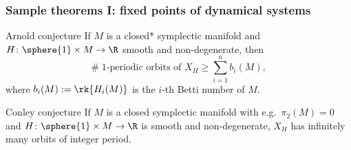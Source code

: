 \begin{frame}
  \frametitle{Sample theorems I: fixed points of dynamical systems}
  \begin{block}{Arnold conjecture}
    If $M$ is a closed* symplectic manifold and $H\colon\sphere{1}\times M\to \R$ smooth and non-degenerate, then
    \vspace{-0.5\baselineskip}
    \[ \#\; \text{$1$-periodic orbits of $X_H$} \geq \sum_{i=1}^n b_i(M),\]
    where $b_i(M) := \rk{H_i(M)}$ is the $i$-th Betti number of $M$.
  \end{block}

  \begin{block}{Conley conjecture}
    If $M$ is a closed symplectic manifold with e.g.\ $\pi_2(M)=0$ and $H\colon \sphere{1}\times M\to\R$ is smooth and non-degenerate,
    $X_H$ has infinitely many  orbits of integer period.
  \end{block}
\end{frame}

